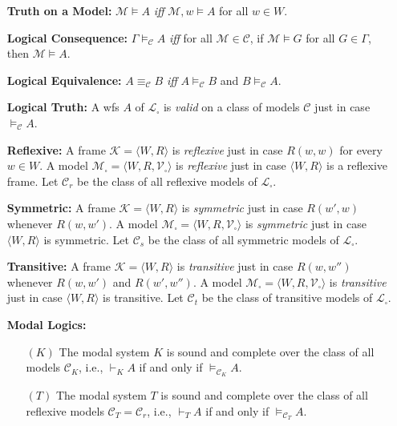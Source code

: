 \documentclass[a4paper, 11pt]{article} %
\newcommand{\tuple}[1]{\langle#1\rangle} %
\newcommand{\M}[0]{\mathcal{M}}
\newcommand{\V}[0]{\mathcal{V}}
\renewcommand{\L}[0]{\mathcal{L}}
\begin{document}
\begin{enumerate}[leftmargin=1.2in,labelsep=.15in] %
\item[\bf Truth on a Model:] $\M\vDash A$ \textit{iff} $\M,w\vDash A$ for all $w\in W$.
\item[\bf Logical Consequence:] $\Gamma\vDash_\mathcal{C} A$ \textit{iff} for all $\mathcal{M}\in\mathcal{C}$, if $\mathcal{M}\vDash G$ for all $G\in\Gamma$, then $\mathcal{M}\vDash  A$.
\item[\bf Logical Equivalence:] $A\equiv_\mathcal{C} B$ \textit{iff} $A\vDash_\mathcal{C} B$ and $B\vDash_\mathcal{C} A$.  
\item[\bf Logical Truth:] A wfs $A$ of $\L_\square$ is \textit{valid} on a class of models $\mathcal{C}$ just in case $\vDash_\mathcal{C} A$.%
\item[\bf Reflexive:] A frame $\mathcal{K}=\tuple{W,R}$ is \textit{reflexive} just in case $R(w,w)$ for every $w\in W$. A model $\mathcal{M}_\square=\tuple{W,R,\V_\square}$ is \textit{reflexive} just in case $\tuple{W,R}$ is a reflexive frame. Let $\mathcal{C}_r$ be the class of all reflexive models of $\L_\square$.
\item[\bf Symmetric:] A frame $\mathcal{K}=\tuple{W,R}$ is \textit{symmetric} just in case $R(w',w)$ whenever $R(w,w')$. A model $\mathcal{M}_\square=\tuple{W,R,\V_\square}$ is \textit{symmetric} just in case $\tuple{W,R}$ is symmetric. Let $\mathcal{C}_s$ be the class of all symmetric models of $\L_\square$.
\item[\bf Transitive:] A frame $\mathcal{K}=\tuple{W,R}$ is \textit{transitive} just in case $R(w,w'')$ whenever $R(w,w')$ and $R(w',w'')$. A model $\mathcal{M}_\square=\tuple{W,R,\V_\square}$ is \textit{transitive} just in case $\tuple{W,R}$ is transitive. Let $\mathcal{C}_t$ be the class of transitive models of $\L_\square$.
\item[\bf Modal Logics:]
	\begin{enumerate}
	\item[$(K)$] The modal system $K$ is sound and complete over the class of all models $\mathcal{C}_K$, i.e., $\vdash_K A$ if and only if $\vDash_{\mathcal{C}_K} A$.
	\item[$(T)$] The modal system $T$ is sound and complete over the class of all reflexive models $\mathcal{C}_T=\mathcal{C}_r$, i.e., $\vdash_T A$ if and only if $\vDash_{\mathcal{C}_T} A$.

\end{enumerate}
\end{enumerate}
\end{document}
